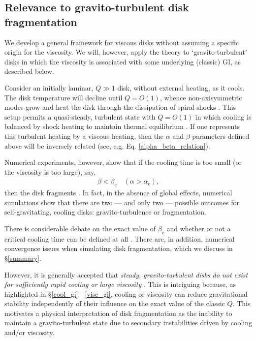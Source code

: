 \documentclass[iop, numberedappendix]{emulateapj}
\begin{document}

\subsection{Relevance to gravito-turbulent disk fragmentation}\label{frag_intro}
We develop a general framework for viscous disks without  
assuming a specific origin for the viscosity. 
We will, however, apply the theory to `gravito-turbulent'
disks in which the viscosity is associated with some underlying
(classic) GI, as described below.  

Consider an initially laminar, $Q\gg1$ disk, without external 
heating, as it cools. The disk temperature will decline
until $Q=O(1)$, whence non-axisymmetric modes grow and heat the disk
through the dissipation of spiral shocks \citep{cossins09}. 
This setup permits a quasi-steady, turbulent state with
$Q =O(1)$ in which cooling is balanced by shock heating to maintain
thermal equilibrium \citep{gammie01}. 
If one represents this turbulent heating by a viscous heating, then
the $\alpha$ and $\beta$ parameters defined above will  
be inversely related (see, e.g. Eq. \ref{alpha_beta_relation}).   

Numerical experiments, however, show that if the cooling time is too
small (or the viscosity is too large), say,   
\begin{align}\label{frag_cond}
  \beta < \beta_\mathrm{c} \quad
  \left(\alpha>\alpha_\mathrm{c}\right), 
\end{align}
then the disk fragments \citep{gammie01,rice05,rice11}. In fact, in 
the absence of global effects, numerical simulations show that there are
two --- and only two --- possible outcomes for self-gravitating,
cooling disks: gravito-turbulence or fragmentation. 

There is considerable debate on the exact value of $\beta_\mathrm{c}$  
and whether or not a critical cooling time can be defined at all
\citep{meru11,lodato11,meru12,paardekooper12,hopkins13}. There are, in
addition, numerical convergence issues when simulating disk  
fragmentation, which we discuss in \S\ref{summary}. 

However, it is generally accepted that \emph{steady, gravito-turbulent
  disks do not  
  exist for sufficiently rapid cooling or large viscosity} \citep{johnson03}.   
This is intriguing because, as highlighted in
\S\ref{cool_gi}---\ref{visc_gi}, cooling or viscosity can reduce 
gravitational stability independently of their influence on the exact
value of the classic $Q$. This motivates a physical      
interpretation of disk fragmentation as the inability to maintain a
gravito-turbulent state due to 
secondary instabilities driven by cooling and/or viscosity.
\end{document}
